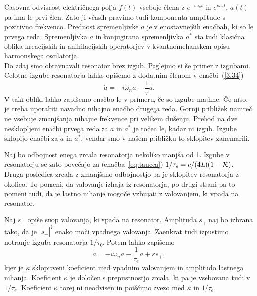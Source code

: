 Časovna odvisnost električnega polja $f(t)$ vsebuje člena z $e^{-i\omega_{n}t}$
in $e^{i\omega_{n}t}$, $a(t)$ pa ima le prvi člen. Zato ji včasih pravimo
tudi komponenta amplitude s pozitivno frekvenco. Prednost spremenljivke
$a$ je v enostavnejših enačbah, ki so le prvega reda. Spremenljivka $a$ in 
konjugirana spremenljivka $a^{*}$ sta tudi klasična oblika kreacijskih
in anihilacijskih operatorjev v kvantnomehanskem opisu harmonskega
oscilatorja.\\

Do zdaj smo obravnavali resonator brez izgub. Poglejmo si še primer z izgubami. 
Celotne izgube resonatorja lahko opišemo z dodatnim členom v enačbi~(\ref{3.34})
\begin{equation}
\dot{a}=-i\omega_{n}a-\frac{1}{\tau}a.
\label{3.36}
\end{equation}
V taki obliki lahko zapišemo enačbo le v primeru, če so izgube majhne. Če niso, 
je treba uporabiti navadno nihajno enačbo drugega reda. Gornji približek
namreč ne vsebuje zmanjšanja nihajne frekvence pri velikem dušenju.
Prehod na dve nesklopljeni enačbi prvega reda za $a$ in $a^*$
je točen le, kadar ni izgub. Izgube sklopijo enačbi za $a$ in $a^{\ast}$, 
vendar smo v našem približku to sklopitev zanemarili.

Naj bo odbojnost enega zrcala resonatorja nekoliko manjša od 1. Izgube v resonatorju 
se zato povečajo za (enačba~\ref{eq:taucca}) $1/\tau_{e}=c/(4L)(1-{\cal R})$. Druga posledica
zrcala z zmanjšano odbojnostjo pa je sklopitev resonatorja z okolico. To pomeni, 
da valovanje izhaja iz resonatorja, po drugi strani pa to pomeni tudi, da je 
lastno nihanje mogoče vzbujati z valovanjem, ki vpada na resonator.

Naj $s_{+}$ opiše snop valovanja, ki vpada na resonator. Amplituda $s_{+}$
naj bo izbrana tako, da je $|s_{+}|^{2}$ enako moči vpadnega valovanja. Zaenkrat
tudi izpustimo notranje izgube resonatorja $1/\tau_{0}$. Potem lahko
zapišemo 
\begin{equation}
\dot{a}=-i\omega_{n}a-\frac{1}{\tau_{e}}a+\kappa s_{+},
\label{3.37}
\end{equation}
kjer je $\kappa$ sklopitveni koeficient med vpadnim valovanjem in
amplitudo lastnega nihanja. Koeficient $\kappa$ je določen
s prepustnostjo zrcala, ki pa je vsebovana tudi v $1/\tau_{e}$. Koeficient
$\kappa$ torej ni neodvisen in poiščimo zvezo med $\kappa$ in $1/\tau_{e}$.


